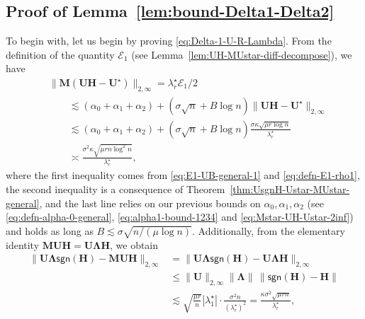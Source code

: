 





\subsection{Proof of Lemma~\ref{lem:bound-Delta1-Delta2}}
\label{sec:proof-auxiliary-distribution}



To begin with, let us begin by proving \eqref{eq:Delta-1-U-R-Lambda}. 
From the definition of the quantity $\mathcal{E}_{1}$ (see Lemma~\ref{lem:UH-MUstar-diff-decompose}), we have
%
\begin{align*}
 & \big\|\bm{M}(\bm{U}\bm{H}-\bm{U}^{\star})\big\|_{2,\infty}=\lambda_{r}^{\star}\mathcal{E}_{1}/2\\
 & \qquad\lesssim\left(\alpha_{0}+\alpha_{1}+\alpha_{2}\right)+\left(\sigma\sqrt{n}+B\log n\right)\big\|\bm{U}\bm{H}-\bm{U}^{\star}\big\|_{2,\infty}\\
 & \qquad\lesssim\left(\alpha_{0}+\alpha_{1}+\alpha_{2}\right)+\left(\sigma\sqrt{n}+B\log n\right)\frac{\sigma\kappa\sqrt{\mu r\log n}}{\lambda_{r}^{\star}}\\
 & \qquad\asymp\frac{\sigma^{2}\kappa\sqrt{\mu rn\log^{2}n}}{\lambda_{r}^{\star}},
\end{align*}
%
where the first inequality comes from \eqref{eq:E1-UB-general-1} and \eqref{eq:defn-E1-rho1},
the second inequality is a consequence of Theorem~\ref{thm:UsgnH-Ustar-MUstar-general}, and 
the last line relies on our previous bounds on $\alpha_0,\alpha_1,\alpha_2$ (see \eqref{eq:defn-alpha-0-general}, \eqref{eq:alpha1-bound-1234} and \eqref{eq:Mstar-UH-Ustar-2inf}) and holds as long as $B\lesssim\sigma\sqrt{n/(\mu\log n)}$. 
%
Additionally, from the elementary identity $\bm{M}\bm{U}\bm{H}=\bm{U}\bm{\Lambda}\bm{H}$, we obtain
%
\begin{align*}
\big\|\bm{U}\bm{\Lambda}\mathsf{sgn}(\bm{H})-\bm{M}\bm{U}\bm{H}\big\|_{2,\infty} & =\big\|\bm{U}\bm{\Lambda}\mathsf{sgn}(\bm{H})-\bm{U}\bm{\Lambda}\bm{H}\big\|_{2,\infty}\\
 & \leq\big\|\bm{U}\big\|_{2,\infty}\big\|\bm{\Lambda}\big\|\,\big\|\mathsf{sgn}(\bm{H})-\bm{H}\big\|\\
 & \lesssim\sqrt{\frac{\mu r}{n}} |\lambda_{1}^{\star} | \cdot\frac{\sigma^{2}n}{(\lambda_{r}^{\star})^{2}}=\frac{\kappa\sigma^{2}\sqrt{\mu rn}}{\lambda_{r}^{\star}},
\end{align*}
